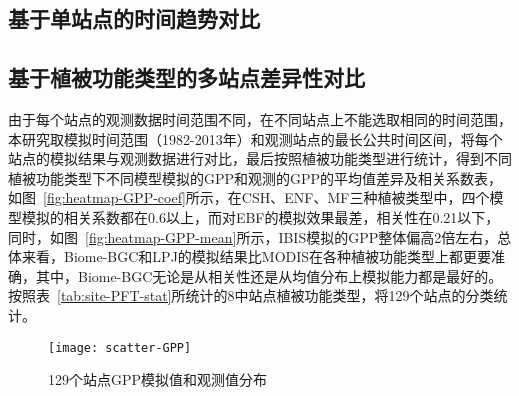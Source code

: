 \subsection{基于单站点的时间趋势对比}


\subsection{基于植被功能类型的多站点差异性对比}
由于每个站点的观测数据时间范围不同，在不同站点上不能选取相同的时间范围，本研究取模拟时间范围（1982-2013年）和观测站点的最长公共时间区间，将每个站点的模拟结果与观测数据进行对比，最后按照植被功能类型进行统计，得到不同植被功能类型下不同模型模拟的GPP和观测的GPP的平均值差异及相关系数表，如图~\ref{fig:heatmap-GPP-coef}所示，在CSH、ENF、MF三种植被类型中，四个模型模拟的相关系数都在0.6以上，而对EBF的模拟效果最差，相关性在0.21以下，同时，如图~\ref{fig:heatmap-GPP-mean}所示，IBIS模拟的GPP整体偏高2倍左右，总体来看，Biome-BGC和LPJ的模拟结果比MODIS在各种植被功能类型上都更要准确，其中，Biome-BGC无论是从相关性还是从均值分布上模拟能力都是最好的。
按照表~\ref{tab:site-PFT-stat}所统计的8中站点植被功能类型，将129个站点的分类统计。

\begin{figure}[!htbp]
    \centering
    \texttt{[image: scatter-GPP]}
    \caption{129个站点GPP模拟值和观测值分布}
    \label{fig:api-gateway-children}
\end{figure}


